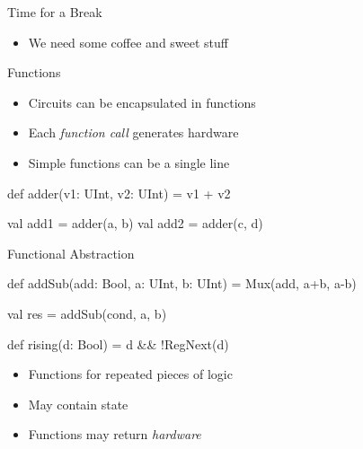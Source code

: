 \begin{frame}[fragile]{Time for a Break}
\begin{itemize}
\item We need some coffee and sweet stuff
\end{itemize}
\end{frame}


\begin{frame}[fragile]{Functions}
\begin{itemize}
\item Circuits can be encapsulated in functions
\item Each \emph{function call} generates hardware
\item Simple functions can be a single line
\end{itemize}
\begin{chisel}
  def adder(v1: UInt, v2: UInt) = v1 + v2
  
  val add1 = adder(a, b)
  val add2 = adder(c, d)
\end{chisel}
\end{frame}

\begin{frame}[fragile]{Functional Abstraction}
\begin{chisel}
  def addSub(add: Bool, a: UInt, b: UInt) =
    Mux(add, a+b, a-b)

  val res = addSub(cond, a, b)
  
  def rising(d: Bool) = d && !RegNext(d)
\end{chisel}
\begin{itemize}
\item Functions for repeated pieces of logic
\item May contain state
\item Functions may return \emph{hardware}
\end{itemize}
\end{frame}

